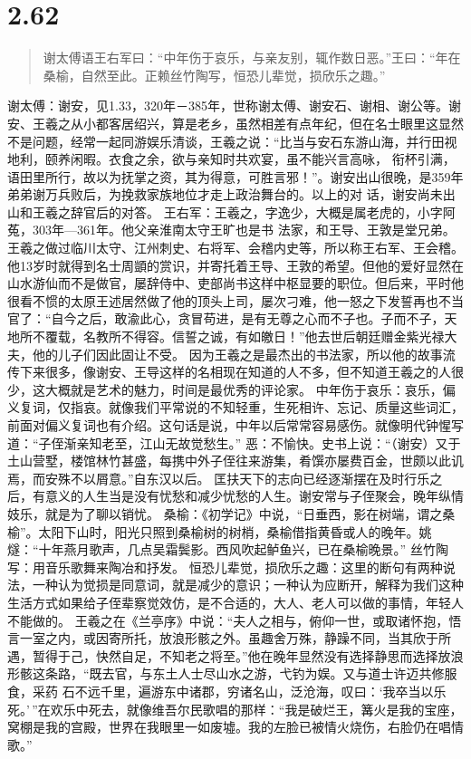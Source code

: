 \documentclass[]{book}
\begin{document}
\section{2.62}\label{section-108}

\begin{quote}
谢太傅语王右军曰：``中年伤于哀乐，与亲友别，辄作数日恶。''王曰：``年在桑榆，自然至此。正赖丝竹陶写，恒恐儿辈觉，损欣乐之趣。''
\end{quote}

谢太傅：谢安，见1.33，320年－385年，世称谢太傅、谢安石、谢相、谢公等。谢安、王羲之从小都客居绍兴，算是老乡，虽然相差有点年纪，但在名士眼里这显然不是问题，经常一起同游娱乐清谈，王羲之说：``比当与安石东游山海，并行田视地利，颐养闲暇。衣食之余，欲与亲知时共欢宴，虽不能兴言高咏，
衔杯引满，语田里所行，故以为抚掌之资，其为得意，可胜言邪！''。谢安出山很晚，是359年弟弟谢万兵败后，为挽救家族地位才走上政治舞台的。以上的对
话，谢安尚未出山和王羲之辞官后的对答。
王右军：王羲之，字逸少，大概是属老虎的，小字阿菟，303年---361年。他父亲淮南太守王旷也是书
法家，和王导、王敦是堂兄弟。王羲之做过临川太守、江州刺史、右将军、会稽内史等，所以称王右军、王会稽。他13岁时就得到名士周顗的赏识，并寄托着王导、王敦的希望。但他的爱好显然在山水游仙而不是做官，屡辞侍中、吏部尚书这样中枢显要的职位。但后来，平时他很看不惯的太原王述居然做了他的顶头上司，屡次刁难，他一怒之下发誓再也不当官了：``自今之后，敢渝此心，贪冒苟进，是有无尊之心而不子也。子而不子，天地所不覆载，名教所不得容。信誓之诚，有如皦日！''他去世后朝廷赠金紫光禄大夫，他的儿子们因此固让不受。
因为王羲之是最杰出的书法家，所以他的故事流传下来很多，像谢安、王导这样的名相现在知道的人不多，但不知道王羲之的人很少，这大概就是艺术的魅力，时间是最优秀的评论家。
中年伤于哀乐：哀乐，偏义复词，仅指哀。就像我们平常说的不知轻重，生死相许、忘记、质量这些词汇，前面对偏义复词也有介绍。这句话是说，中年以后常常容易感伤。就像明代钟惺写道：``子侄渐亲知老至，江山无故觉愁生。''
恶：不愉快。史书上说：``（谢安）又于土山营墅，楼馆林竹甚盛，每携中外子侄往来游集，肴馔亦屡费百金，世颇以此讥焉，而安殊不以屑意。''自东汉以后。
匡扶天下的志向已经逐渐摆在及时行乐之后，有意义的人生当是没有忧愁和减少忧愁的人生。谢安常与子侄聚会，晚年纵情妓乐，就是为了聊以销忧。
桑榆：《初学记》中说，``日垂西，影在树端，谓之桑榆''。太阳下山时，阳光只照到桑榆树的树梢，桑榆借指黄昏或人的晚年。姚燧：``十年燕月歌声，几点吴霜鬓影。西风吹起鲈鱼兴，已在桑榆晚景。''
丝竹陶写：用音乐歌舞来陶冶和抒发。
恒恐儿辈觉，损欣乐之趣：这里的断句有两种说法，一种认为觉损是同意词，就是减少的意识；一种认为应断开，解释为我们这种生活方式如果给子侄辈察觉效仿，是不合适的，大人、老人可以做的事情，年轻人不能做的。
王羲之在《兰亭序》中说：``夫人之相与，俯仰一世，或取诸怀抱，悟言一室之内，或因寄所托，放浪形骸之外。虽趣舍万殊，静躁不同，当其欣于所遇，暂得于己，快然自足，不知老之将至。''他在晚年显然没有选择静思而选择放浪形骸这条路，``既去官，与东土人士尽山水之游，弋钓为娱。又与道士许迈共修服食，采药
石不远千里，遍游东中诸郡，穷诸名山，泛沧海，叹曰：`我卒当以乐死。'\,''在欢乐中死去，就像维吾尔民歌唱的那样：``我是破烂王，篝火是我的宝座，窝棚是我的宫殿，世界在我眼里一如废墟。我的左脸已被情火烧伤，右脸仍在唱情歌。''
\end{document}
